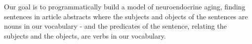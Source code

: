 Our goal is to programmatically build a model of neuroendocrine aging,
finding sentences in article abstracts where the subjects and objects
of the sentences are nouns in our vocabulary - and the predicates of the
sentence, relating the subjects and the objects, are verbs in our
vocabulary.
